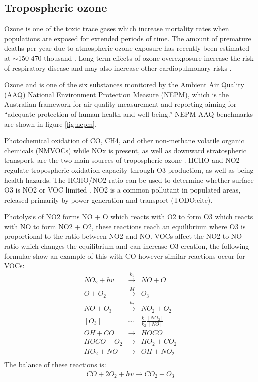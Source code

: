 \subsection{Tropospheric ozone}


Ozone is one of the toxic trace gases which increase mortality rates when populations are exposed for extended periods of time.
The amount of premature deaths per year due to atmospheric ozone exposure has recently been estimated at $\sim$150-470 thousand \cite{Silva_2013, Lelieveld_2015}.
Long term effects of ozone overexposure increase the risk of respiratory disease and may also increase other cardiopulmonary risks \cite{Jerrett_2009}.

Ozone and is one of the six substances monitored by the Ambient Air Quality (AAQ) National Environment Protection Measure (NEPM), which is the Australian framework for air quality measurement and reporting aiming for ``adequate protection of human health and well-being.''
NEPM AAQ benchmarks are shown in figure \ref{fig:nepm}.

Photochemical oxidation of CO, CH4, and other non-methane volatile organic chemicals (NMVOCs) while NOx is present, as well as downward stratospheric transport, are the two main sources of tropospheric ozone \cite{Stevenson_2006}.
HCHO and NO2 regulate tropospheric oxidation capacity through O3 production, as well as being health hazards.
The HCHO/NO2 ratio can be used to determine whether surface O3 is NO2 or VOC limited \cite{Mahajan_2015}.
NO2 is a common pollutant in populated areas, released primarily by power generation and transport (TODO:cite). 

Photolysis of NO2 forms NO + O which reacts with O2 to form O3 which reacts with NO to form NO2 + O2, these reactions reach an equilibrium where O3 is proportional to the ratio between NO2 and NO.
VOCs affect the NO2 to NO ratio which changes the equilibrium and can increase O3 creation, the following formulae show an example of this with CO however similar reactions occur for VOCs:
\begin{eqnarray*}
NO_2 + hv &\overset{k_1}{\rightarrow}& NO + O \\
O + O_2 &\overset{M}{\rightarrow}& O_3 \\
NO + O_3 &\overset{k_2}{\rightarrow}& NO_2 + O_2 \\
[O_3] &\sim& \frac{k_1}{k_2} \frac{[NO_2]}{[NO]} \\
OH + CO &{\rightarrow}& HOCO \\
HOCO + O_2 &{\rightarrow}& HO_2 + CO_2 \\
HO_2 + NO &{\rightarrow}& OH + NO_2 \\
\end{eqnarray*}
The balance of these reactions is:
\begin{eqnarray*} CO + 2O_2 + hv {\rightarrow} CO_2 + O_3 \end{eqnarray*}

